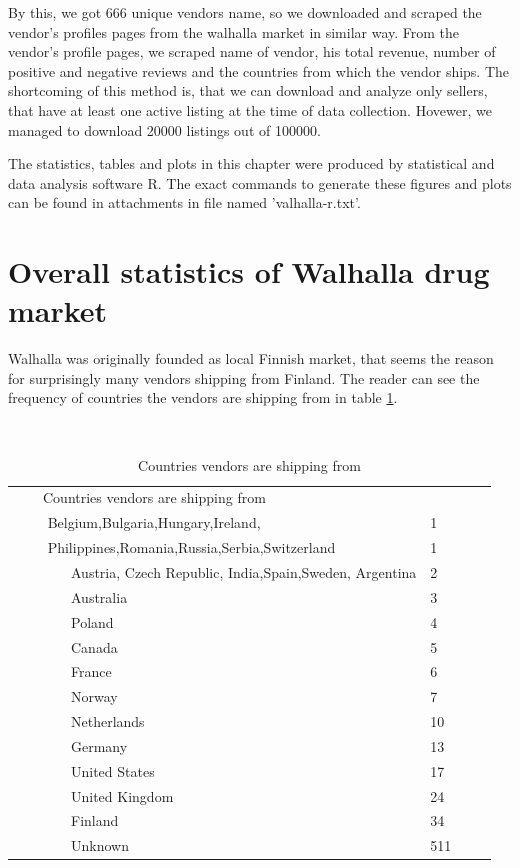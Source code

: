 \documentclass[
  digital, %
  table,   %
  lof,     %
  lot,     %
  oneside
]{fithesis3}
\begin{document}
By this, we got 666 unique vendors name, so we downloaded and scraped the vendor's profiles pages from the walhalla 
market in similar way.
From the vendor's profile pages, we scraped name of vendor, his total revenue, number of positive and negative reviews 
and the countries from which the vendor ships.
The shortcoming of this method is, that we can download and analyze only sellers, 
that have at least one active listing at the time of data collection. 
Hovewer, we managed to download 20000 listings out of 100000.

The statistics, tables and plots in this chapter were produced by statistical and data analysis software R.
The exact commands to generate these figures and plots can be found in attachments in file named 'valhalla-r.txt'.

\section{Overall statistics of Walhalla drug market}

Walhalla was originally founded as local Finnish market,
that seems the reason for surprisingly many vendors shipping from Finland.
The reader can see the frequency of countries the vendors are shipping from in table \ref{shipcount}.

\begin{table}
    \caption{Countries vendors are shipping from}
    \label{shipcount}
    \begin{tabular}{|l|l|}
    Countries vendors are shipping from\\
      Belgium,Bulgaria,Hungary,Ireland, & 1\\
      Philippines,Romania,Russia,Serbia,Switzerland& 1   \\
        Austria, Czech Republic, India,Spain,Sweden, Argentina  & 2   \\
        Australia                                    & 3   \\ 
        Poland                                       & 4   \\ 
        Canada                                       & 5   \\ 
        France                                       & 6   \\ 
        Norway                                       & 7   \\ 
        Netherlands                                  & 10  \\ 
        Germany                                      & 13  \\ 
        United States                                & 17  \\ 
        United Kingdom                               & 24  \\ 
        Finland                                      & 34  \\ 
        Unknown                                      & 511  
    \end{tabular}
\end{table}
\end{document}
